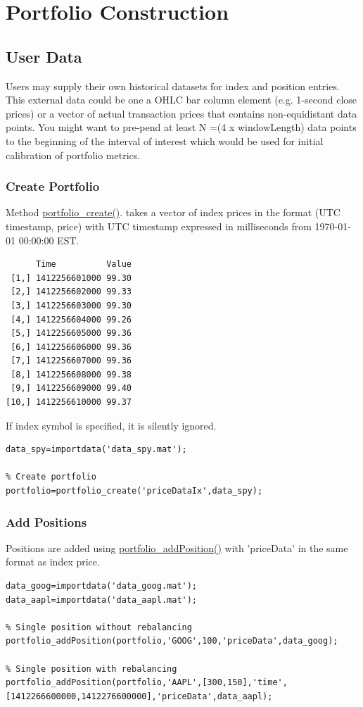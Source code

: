 \documentclass[letterpaper]{report}
\newcounter{N}
\begin{document}
\chapter{Portfolio Construction}
\section{User Data}
Users may supply their own historical datasets for index and position entries. 
This external data could be one a OHLC bar column element (e.g. 1-second close prices) or a vector of actual transaction prices that contains non-equidistant data points. 
You might want to pre-pend at least N =(4 x windowLength) data points to the
beginning of the interval of interest which would be used for initial calibration of portfolio metrics.
\subsection{Create Portfolio} 
Method
\href{https://www.portfolioeffect.com/docs/platform/quant/functions/general-functions/portfolio-create}{portfolio\_create()}.
takes a vector of index prices in the format (UTC timestamp, price) with UTC
timestamp expressed in milliseconds from 1970-01-01 00:00:00 EST.
\begin{lstlisting}
      Time          Value
 [1,] 1412256601000 99.30
 [2,] 1412256602000 99.33
 [3,] 1412256603000 99.30
 [4,] 1412256604000 99.26
 [5,] 1412256605000 99.36
 [6,] 1412256606000 99.36
 [7,] 1412256607000 99.36
 [8,] 1412256608000 99.38
 [9,] 1412256609000 99.40
[10,] 1412256610000 99.37
\end{lstlisting}
If index symbol is specified, it is silently ignored.
\begin{lstlisting}
data_spy=importdata('data_spy.mat'); 

% Create portfolio
portfolio=portfolio_create('priceDataIx',data_spy);
\end{lstlisting}

\subsection {Add Positions}
Positions are added using 
\href{https://www.portfolioeffect.com/docs/platform/quant/functions/general-functions/portfolio-add-position}{portfolio\_addPosition()}
with 'priceData' in the same format as index price.
\begin{lstlisting}
data_goog=importdata('data_goog.mat');
data_aapl=importdata('data_aapl.mat');

% Single position without rebalancing
portfolio_addPosition(portfolio,'GOOG',100,'priceData',data_goog); 

% Single position with rebalancing
portfolio_addPosition(portfolio,'AAPL',[300,150],'time',[1412266600000,1412276600000],'priceData',data_aapl); 
\end{lstlisting}
\end{document}
